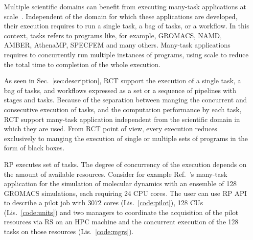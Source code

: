 


Multiple scientific domains can benefit from executing many-task applications
at scale~\cite{raicu2008many,iosup2011performance}. Independent of the domain
for which these applications are developed, their execution requires to run a
single task, a bag of tasks, or a workflow. In this context, tasks refers to
programs like, for example, GROMACS, NAMD, AMBER, AthenaMP, SPECFEM and many
others. Many-task applications requires to concurrently run multiple
instances of programs, using scale to reduce the total time to completion of
the whole execution.

As seen in Sec.~\ref{sec:description}, RCT support the execution of a single
task, a bag of tasks, and workflows expressed as a set or a sequence of
pipelines with stages and tasks. Because of the separation between manging
the concurrent and consecutive execution of tasks, and the computation
performance by each task, RCT support many-task application independent from
the scientific domain in which they are used. From RCT point of view, every
execution reduces exclusively to manging the execution of single or multiple
sets of programs in the form of black boxes.

RP executes set of tasks. The degree of concurrency of the execution depends
on the amount of available resources. Consider for example
Ref.~\cite{balasubramanian2016extasy}'s many-task application for the
simulation of molecular dynamics with an ensemble of 128 GROMACS simulations,
each requiring 24 CPU cores. The user can use RP API to describe a pilot job
with 3072 cores (Lis.~\ref{code:pilot}), 128 CUs (Lis.~\ref{code:units}) and
two managers to coordinate the acquisition of the pilot resources via RS on
an HPC machine and the concurrent execution of the 128 tasks on those
resources (Lis.~\ref{code:mgrs}).


